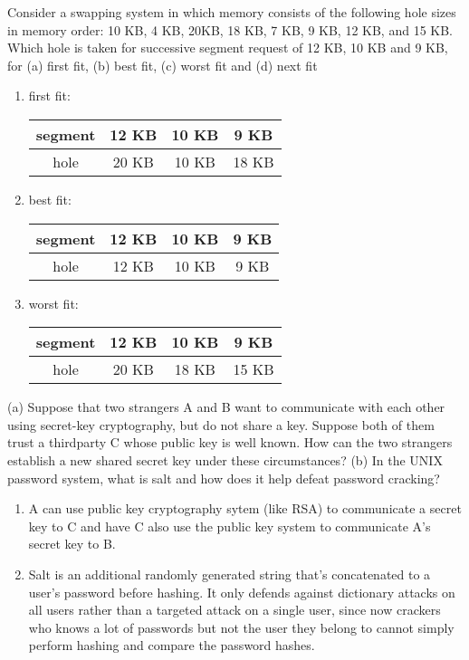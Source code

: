 \documentclass[12pt]{article}
\newenvironment{problem}[2][Problem]{\begin{trivlist}
\item[\hskip \labelsep {\bfseries #1}\hskip \labelsep {\bfseries #2.}]}{\end{trivlist}}
\begin{document}
\begin{problem}{2}
  Consider a swapping system in which memory consists of the following
hole sizes in memory order: 10 KB, 4 KB, 20KB, 18 KB, 7 KB, 9 KB, 12 KB, and 15 KB. Which
hole is taken for successive segment request of 12 KB, 10 KB and 9 KB, for (a) first fit, (b) best
fit, (c) worst fit and (d) next fit

  \begin{enumerate}[label=(\alph*)]
    \item first fit:\\
    \begin{tabular}[b]{|c|c|c|c|}
      \hline
      segment & 12 KB & 10 KB & 9 KB\\
      \hline
      hole & 20 KB & 10 KB & 18 KB\\
      \hline
    \end{tabular}
    \item best fit:\\
    \begin{tabular}[b]{|c|c|c|c|}
      \hline
      segment & 12 KB & 10 KB & 9 KB\\
      \hline
      hole & 12 KB & 10 KB & 9 KB\\
      \hline
    \end{tabular}
    \item worst fit:\\
    \begin{tabular}[b]{|c|c|c|c|}
      \hline
      segment & 12 KB & 10 KB & 9 KB\\
      \hline
      hole & 20 KB & 18 KB & 15 KB\\
      \hline
    \end{tabular}
  \end{enumerate}
\end{problem}
\pagebreak
\begin{problem}{3}
  (a) Suppose that two strangers A and B want to communicate with each
other using secret-key cryptography, but do not share a key. Suppose both of them trust a thirdparty C whose public key is well known. How can the two strangers establish a new shared secret
key under these circumstances? (b) In the UNIX password system, what is salt and how does it
help defeat password cracking?

  \begin{enumerate}[label=(\alph*)]
    \item A can use public key cryptography sytem (like RSA) to communicate a secret key to C and have C also use the public key system to communicate A's secret key to B.\\
    \item Salt is an additional randomly generated string that's concatenated to a user's password before hashing. 
    It only defends against dictionary attacks on all users rather than a targeted attack on a single user, since now crackers who knows a lot of passwords but not the user they belong to 
    cannot simply perform hashing and compare the password hashes.
  \end{enumerate}
\end{problem}
\end{document}
